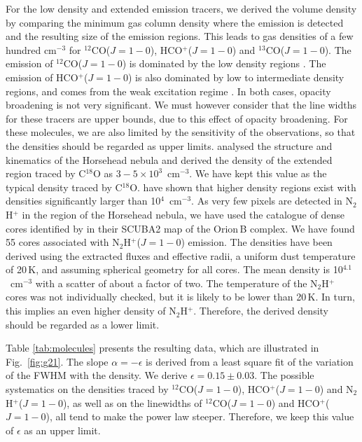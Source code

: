 \documentclass[structabstract]{aa}
\newcommand{\emm}[1]{\ensuremath{#1}}
\newcommand{\emr}[1]{\emm{\mathrm{#1}}}
\newcommand{\unit}[1]{\emr{\,#1}}
\newcommand{\K}{\unit{K}}
\begin{document}
For the low density and extended emission tracers, we derived the volume density by comparing the minimum gas column density where the emission is detected and the resulting size of the emission regions. This leads to gas densities of a few hundred cm$^{-3}$ for $^{12}$CO($J=1-0$), HCO$^+$($J=1-0$) and  $^{13}$CO($J=1-0$). The emission of $^{12}$CO($J=1-0$) is dominated by the low density regions \citep{pety16}. The emission of HCO$^+$($J=1-0$) is also dominated by low to intermediate density regions, and comes from the weak excitation regime \citep{liszt16}. In both cases, opacity broadening is not very significant. We must however consider that the line widths for these tracers are upper bounds, due to this effect of opacity broadening. For these molecules, we are also limited by the sensitivity of the observations, so that the densities should be regarded as upper limits. \citet{hilyblant05} analysed the structure and kinematics of the Horsehead nebula and derived the density of the extended region traced by C$^{18}$O as $3 - 5 \times 10^{3}$~cm$^{-3}$. We have kept this value as the typical density traced by C$^{18}$O.  \citet{hilyblant05} have shown that higher density regions exist with densities significantly larger than 10$^4$~cm$^{-3}$. As very few pixels are detected in N$_2$H$^+$ in the region of the Horsehead nebula, we have used the catalogue of dense cores  identified by \citet{kirk16} in their SCUBA2 map of the Orion\,B complex. We have found 55 cores associated with N$_2$H$^+$($J=1-0$) emission. The densities have been derived using the extracted fluxes and effective radii, a uniform dust temperature of 20\K, and assuming spherical geometry for all cores. The mean density is 10$^{4.1}$~cm$^{-3}$ with a scatter of about a factor of two. The temperature of the N$_2$H$^+$ cores was not individually checked, but it is likely to be lower than 20\K. In turn, this implies an even higher density of N$_2$H$^+$. Therefore, the derived density should be regarded as a lower limit.

Table \ref{tab:molecules} presents the resulting data, which are illustrated in Fig.~\ref{fig:g21}. The slope $\alpha = -\epsilon$ is derived from a least square fit of the variation of the FWHM with the density. We derive $\epsilon = 0.15 \pm 0.03$. The possible systematics on the densities traced by $^{12}$CO($J=1-0$), HCO$^+$($J=1-0$) and N$_2$H$^+$($J=1-0$), as well as on the linewidths of $^{12}$CO($J=1-0$) and HCO$^+$($J=1-0$), all tend to make the power law steeper. Therefore, we keep this value of $\epsilon$ as an upper limit.
\end{document}
